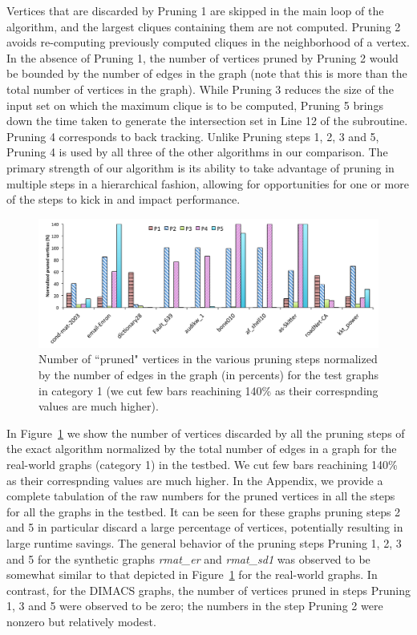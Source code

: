 Vertices that are discarded by Pruning 1 are skipped in the main loop of the algorithm, and the largest cliques containing them are not computed. Pruning 2 avoids re-computing previously computed cliques in the neighborhood of a vertex. In the absence of Pruning 1, the number of vertices pruned by Pruning 2 would be bounded by the number of edges in the graph (note that this is more than the total number of vertices in the graph). While Pruning 3 reduces the size of the input set on which the maximum clique is to be computed, Pruning 5 brings down the time taken to generate the intersection set in Line 12 of the subroutine. 
Pruning 4 corresponds to back tracking. Unlike Pruning steps 1, 2, 3 and 5, Pruning 4
is used  by all three of the other algorithms in our comparison. The primary strength of our algorithm is its ability to take advantage of pruning in multiple steps in a hierarchical fashion, allowing for opportunities for one or more of the steps to kick in and impact performance.

\begin{figure}
  \centering
    \includegraphics[scale=0.5]{pruned.pdf}
\caption{Number of ``pruned" vertices in the various pruning steps normalized
by the number of edges in the graph (in percents) for the test graphs in category 1 (we cut few bars reachining 140\% as their correspnding values are much higher).}
\label{fig-pruningplot}
\end{figure}


In Figure~\ref{fig-pruningplot} we show the number of vertices discarded by all
the  pruning steps of the exact algorithm normalized by the total number of edges
in a graph for the real-world graphs (category 1) in the testbed. We cut few bars reachining
140\% as their correspnding values are much higher.
In the Appendix, we provide a complete tabulation of the raw numbers for the pruned vertices in all the steps for all the graphs in the testbed. It can be seen for these graphs pruning steps 2 and 5 in particular discard a large percentage of vertices, potentially resulting in large runtime savings. The general behavior of the pruning steps Pruning 1, 2, 3 and 5 for the synthetic graphs {\em rmat\_er} and {\em rmat\_sd1} was observed to be somewhat similar to that depicted in Figure~\ref{fig-pruningplot} for the real-world graphs. In contrast, for the DIMACS graphs, the number of vertices pruned in steps Pruning 1, 3 and 5 were observed to be zero; the numbers in the step Pruning 2 were nonzero but relatively modest.


